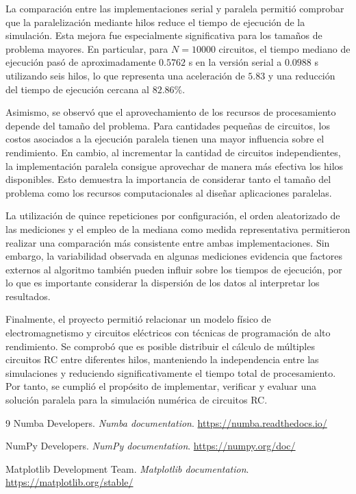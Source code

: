 \documentclass[11pt,a4paper]{article}
\begin{document}
La comparación entre las implementaciones serial y paralela permitió comprobar que la paralelización mediante hilos reduce el tiempo de ejecución de la simulación. Esta mejora fue especialmente significativa para los tamaños de problema mayores. En particular, para $N=10000$ circuitos, el tiempo mediano de ejecución pasó de aproximadamente $0.5762$ s en la versión serial a $0.0988$ s utilizando seis hilos, lo que representa una aceleración de $5.83$ y una reducción del tiempo de ejecución cercana al $82.86\%$.

Asimismo, se observó que el aprovechamiento de los recursos de procesamiento depende del tamaño del problema. Para cantidades pequeñas de circuitos, los costos asociados a la ejecución paralela tienen una mayor influencia sobre el rendimiento. En cambio, al incrementar la cantidad de circuitos independientes, la implementación paralela consigue aprovechar de manera más efectiva los hilos disponibles. Esto demuestra la importancia de considerar tanto el tamaño del problema como los recursos computacionales al diseñar aplicaciones paralelas.

La utilización de quince repeticiones por configuración, el orden aleatorizado de las mediciones y el empleo de la mediana como medida representativa permitieron realizar una comparación más consistente entre ambas implementaciones. Sin embargo, la variabilidad observada en algunas mediciones evidencia que factores externos al algoritmo también pueden influir sobre los tiempos de ejecución, por lo que es importante considerar la dispersión de los datos al interpretar los resultados.

Finalmente, el proyecto permitió relacionar un modelo físico de electromagnetismo y circuitos eléctricos con técnicas de programación de alto rendimiento. Se comprobó que es posible distribuir el cálculo de múltiples circuitos RC entre diferentes hilos, manteniendo la independencia entre las simulaciones y reduciendo significativamente el tiempo total de procesamiento. Por tanto, se cumplió el propósito de implementar, verificar y evaluar una solución paralela para la simulación numérica de circuitos RC.


\begin{thebibliography}{9}
Numba Developers. \textit{Numba documentation}. \url{https://numba.readthedocs.io/}

NumPy Developers. \textit{NumPy documentation}. \url{https://numpy.org/doc/}

Matplotlib Development Team. \textit{Matplotlib documentation}. \url{https://matplotlib.org/stable/}
\end{thebibliography}
\end{document}
